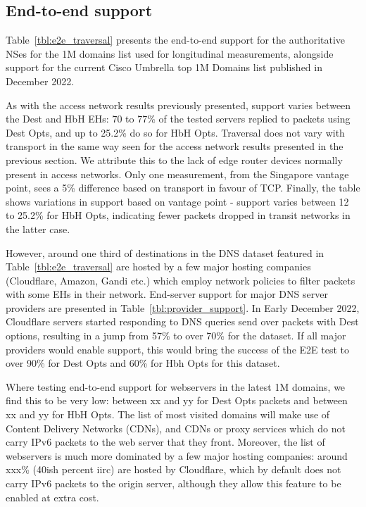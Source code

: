 \documentclass[conference]{IEEEtran}
\begin{document}
\subsection{End-to-end support}
\label{subsec:e2esupport}

Table~\ref{tbl:e2e_traversal} presents the end-to-end support for the authoritative NSes for the 1M domains list used for longitudinal measurements, alongside support for the current Cisco Umbrella top 1M Domains list published in December 2022.

As with the access network results previously presented, support varies between the Dest and HbH EHs: 70 to 77\% of the tested servers replied to packets using Dest Opts, and up to 25.2\% do so for HbH Opts. Traversal does not vary with transport in the same way seen for the access network results presented in the previous section. We attribute this to the lack of edge router devices normally present in access networks. Only one measurement, from the Singapore vantage point, sees a 5\% difference based on transport in favour of TCP.
Finally, the table shows variations in support based on vantage point - support varies between 12 to 25.2\% for HbH Opts, indicating fewer packets dropped in transit networks in the latter case.

However, around one third of destinations in the DNS dataset featured in Table~\ref{tbl:e2e_traversal} are hosted by a few major hosting companies (Cloudflare, Amazon, Gandi etc.) which employ network policies to filter packets with some EHs in their network. End-server support for major DNS server providers are presented in Table~\ref{tbl:provider_support}. In Early December 2022, Cloudflare servers started responding to DNS queries send over packets with Dest options, resulting in a jump from 57\% to over 70\% for the dataset. If all major providers would enable support, this would bring the success of the E2E test to over 90\% for Dest Opts and 60\% for Hbh Opts for this dataset.

Where testing end-to-end support for webservers in the latest 1M domains, we find this to be very low: between xx and yy for Dest Opts packets and between xx and yy for HbH Opts.
The list of most visited domains will make use of Content Delivery Networks (CDNs), and CDNs or proxy services which do not carry IPv6 packets to the web server that they front. Moreover, the list of webservers is much more dominated by a few major hosting companies: around xxx\% (40ish percent iirc) are hosted by Cloudflare, which by default does not carry IPv6 packets to the origin server, although they allow this feature to be enabled at extra cost.
\end{document}
